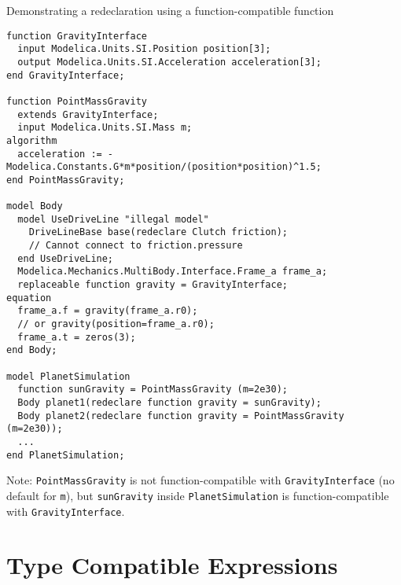 \begin{example}
Demonstrating a redeclaration using a function-compatible function
\begin{lstlisting}[language=modelica]
function GravityInterface
  input Modelica.Units.SI.Position position[3];
  output Modelica.Units.SI.Acceleration acceleration[3];
end GravityInterface;

function PointMassGravity
  extends GravityInterface;
  input Modelica.Units.SI.Mass m;
algorithm
  acceleration := -Modelica.Constants.G*m*position/(position*position)^1.5;
end PointMassGravity;

model Body
  model UseDriveLine "illegal model"
    DriveLineBase base(redeclare Clutch friction);
    // Cannot connect to friction.pressure
  end UseDriveLine;
  Modelica.Mechanics.MultiBody.Interface.Frame_a frame_a;
  replaceable function gravity = GravityInterface;
equation
  frame_a.f = gravity(frame_a.r0);
  // or gravity(position=frame_a.r0);
  frame_a.t = zeros(3);
end Body;

model PlanetSimulation
  function sunGravity = PointMassGravity (m=2e30);
  Body planet1(redeclare function gravity = sunGravity);
  Body planet2(redeclare function gravity = PointMassGravity (m=2e30));
  ...
end PlanetSimulation;
\end{lstlisting}

Note: \lstinline!PointMassGravity! is not function-compatible with
\lstinline!GravityInterface! (no default for \lstinline!m!), but \lstinline!sunGravity!
inside \lstinline!PlanetSimulation! is function-compatible with
\lstinline!GravityInterface!.
\end{example}

\section{Type Compatible Expressions}

